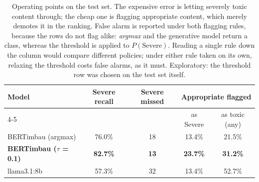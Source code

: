 \begin{table}[!t]
\centering
\caption{Operating points on the test set. The expensive error is letting severely toxic content through; the cheap one is flagging appropriate content, which merely demotes it in the ranking. False alarm is reported under both flagging rules, because the rows do not flag alike: \emph{argmax} and the generative model return a class, whereas the threshold is applied to $P(\text{Severe})$. Reading a single rule down the column would compare different policies; under either rule taken on its own, relaxing the threshold costs false alarms, as it must. Exploratory: the threshold row was chosen on the test set itself.}
\label{tab:pontos-operacao-teste}
\begin{tabular}{lcccc}
\toprule
Model & Severe recall & Severe missed & \multicolumn{2}{c}{Appropriate flagged} \\
\cmidrule(lr){4-5}
 & & & as Severe & as toxic (any)  \\
\midrule
BERTimbau (argmax) & 76.0\% & 18 & 13.4\% & 21.5\% \\
\textbf{BERTimbau ($\tau$ = 0.1)} & \textbf{82.7\%} & \textbf{13} & \textbf{23.7\%} & \textbf{31.2\%} \\
llama3.1:8b & 57.3\% & 32 & 13.4\% & 52.7\% \\
\bottomrule
\end{tabular}
\end{table}
